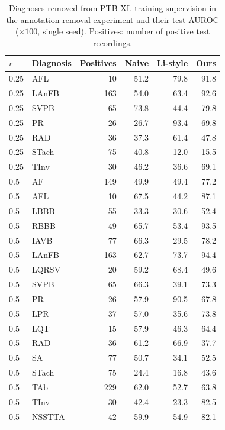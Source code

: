 \begin{table}[h]\centering\footnotesize
\caption{Diagnoses removed from PTB-XL training supervision in the annotation-removal experiment and their test AUROC ($\times100$, single seed). Positives: number of positive test recordings.}\label{tab:e2diag}
\begin{tabular}{llrrrr}
\toprule $r$ & Diagnosis & Positives & Naive & Li-style & Ours \\ \midrule
0.25 & AFL & 10 & 51.2 & 79.8 & 91.8 \\
0.25 & LAnFB & 163 & 54.0 & 63.4 & 92.6 \\
0.25 & SVPB & 65 & 73.8 & 44.4 & 79.8 \\
0.25 & PR & 26 & 26.7 & 93.4 & 69.8 \\
0.25 & RAD & 36 & 37.3 & 61.4 & 47.8 \\
0.25 & STach & 75 & 40.8 & 12.0 & 15.5 \\
0.25 & TInv & 30 & 46.2 & 36.6 & 69.1 \\
\midrule
0.5 & AF & 149 & 49.9 & 49.4 & 77.2 \\
0.5 & AFL & 10 & 67.5 & 44.2 & 87.1 \\
0.5 & LBBB & 55 & 33.3 & 30.6 & 52.4 \\
0.5 & RBBB & 49 & 65.7 & 53.4 & 93.5 \\
0.5 & IAVB & 77 & 66.3 & 29.5 & 78.2 \\
0.5 & LAnFB & 163 & 62.7 & 73.7 & 94.4 \\
0.5 & LQRSV & 20 & 59.2 & 68.4 & 49.6 \\
0.5 & SVPB & 65 & 66.3 & 39.1 & 73.3 \\
0.5 & PR & 26 & 57.9 & 90.5 & 67.8 \\
0.5 & LPR & 37 & 57.0 & 35.6 & 73.8 \\
0.5 & LQT & 15 & 57.9 & 46.3 & 64.4 \\
0.5 & RAD & 36 & 61.2 & 66.9 & 37.7 \\
0.5 & SA & 77 & 50.7 & 34.1 & 52.5 \\
0.5 & STach & 75 & 24.4 & 16.8 & 43.6 \\
0.5 & TAb & 229 & 62.0 & 52.7 & 63.8 \\
0.5 & TInv & 30 & 42.4 & 23.3 & 82.5 \\
0.5 & NSSTTA & 42 & 59.9 & 54.9 & 82.1 \\
\bottomrule
\end{tabular}
\end{table}
